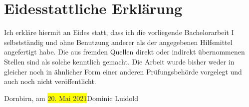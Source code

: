 \documentclass[a4paper,12pt,twoside]{scrreprt}
\begin{document}
\chapter*{Eidesstattliche Erklärung}
Ich erkläre hiermit an Eides statt, dass ich die vorliegende Bachelorarbeit I selbstständig und ohne Benutzung anderer als der angegebenen Hilfsmittel angefertigt habe. Die aus fremden Quellen direkt oder indirekt übernommenen Stellen sind als solche kenntlich gemacht. Die Arbeit wurde bisher weder in gleicher noch in ähnlicher Form einer anderen Prüfungsbehörde vorgelegt und auch noch nicht veröffentlicht.

\vspace{5cm}
\noindent
Dornbirn, am \colorbox{yellow}{20. Mai 2021}\hfill Dominic Luidold
\end{document}
